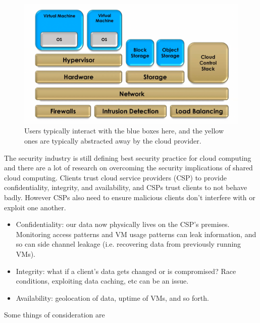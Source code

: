 \documentclass[../notes.tex]{subfiles}
\begin{document}
\begin{figure}[H]
    \centering
    \includegraphics[width=0.8\linewidth]{img/image_2023-04-16-19-49-54.png}
    \caption{Users typically interact with the blue boxes here, and the yellow ones are typically abstracted away by the cloud provider.}
\end{figure}

The security industry is still defining best security practice for cloud computing and there are a lot of research on overcoming the security implications of shared cloud computing.
Clients trust cloud service providers (CSP) to provide confidentiality, integrity, and availability, and CSPs trust clients to not behave badly. However CSPs also need to ensure malicious clients don't interfere with or exploit one another.

\begin{itemize}
    \item Confidentiality: our data now physically lives on the CSP's premises. Monitoring access patterns and VM usage patterns can leak information, and so can side channel leakage (i.e. recovering data from previously running VMs).
    \item Integrity: what if a client's data gets changed or is compromised? Race conditions, exploiting data caching, etc can be an issue.
    \item Availability: geolocation of data, uptime of VMs, and so forth.
\end{itemize}

Some things of consideration are
\end{document}
